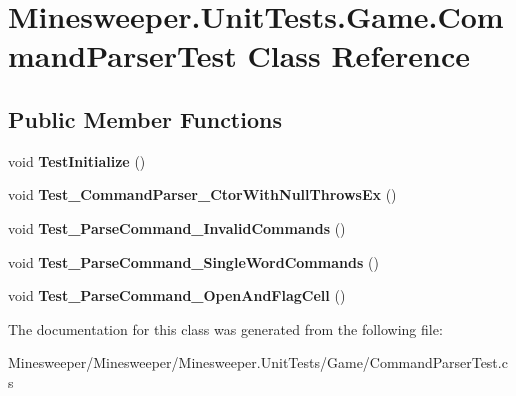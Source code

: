 \hypertarget{class_minesweeper_1_1_unit_tests_1_1_game_1_1_command_parser_test}{\section{Minesweeper.\+Unit\+Tests.\+Game.\+Command\+Parser\+Test Class Reference}
\label{class_minesweeper_1_1_unit_tests_1_1_game_1_1_command_parser_test}
}
\subsection*{Public Member Functions}
\begin{DoxyCompactItemize}
\item 
\hypertarget{class_minesweeper_1_1_unit_tests_1_1_game_1_1_command_parser_test_aba7a6ca5a792ec858aceea6c6d4f8e46}{void {\bfseries Test\+Initialize} ()}\label{class_minesweeper_1_1_unit_tests_1_1_game_1_1_command_parser_test_aba7a6ca5a792ec858aceea6c6d4f8e46}

\item 
\hypertarget{class_minesweeper_1_1_unit_tests_1_1_game_1_1_command_parser_test_a11b510a6589053e1de8ae4cfaf1f67e9}{void {\bfseries Test\+\_\+\+Command\+Parser\+\_\+\+Ctor\+With\+Null\+Throws\+Ex} ()}\label{class_minesweeper_1_1_unit_tests_1_1_game_1_1_command_parser_test_a11b510a6589053e1de8ae4cfaf1f67e9}

\item 
\hypertarget{class_minesweeper_1_1_unit_tests_1_1_game_1_1_command_parser_test_a1af3ff2c9e6e18615de38089240ce0b3}{void {\bfseries Test\+\_\+\+Parse\+Command\+\_\+\+Invalid\+Commands} ()}\label{class_minesweeper_1_1_unit_tests_1_1_game_1_1_command_parser_test_a1af3ff2c9e6e18615de38089240ce0b3}

\item 
\hypertarget{class_minesweeper_1_1_unit_tests_1_1_game_1_1_command_parser_test_a79b045882d2d59228762410c34618ff3}{void {\bfseries Test\+\_\+\+Parse\+Command\+\_\+\+Single\+Word\+Commands} ()}\label{class_minesweeper_1_1_unit_tests_1_1_game_1_1_command_parser_test_a79b045882d2d59228762410c34618ff3}

\item 
\hypertarget{class_minesweeper_1_1_unit_tests_1_1_game_1_1_command_parser_test_aadf10189d8655ce986f59259ab919db9}{void {\bfseries Test\+\_\+\+Parse\+Command\+\_\+\+Open\+And\+Flag\+Cell} ()}\label{class_minesweeper_1_1_unit_tests_1_1_game_1_1_command_parser_test_aadf10189d8655ce986f59259ab919db9}

\end{DoxyCompactItemize}


The documentation for this class was generated from the following file\+:\begin{DoxyCompactItemize}
\item 
Minesweeper/\+Minesweeper/\+Minesweeper.\+Unit\+Tests/\+Game/Command\+Parser\+Test.\+cs\end{DoxyCompactItemize}
